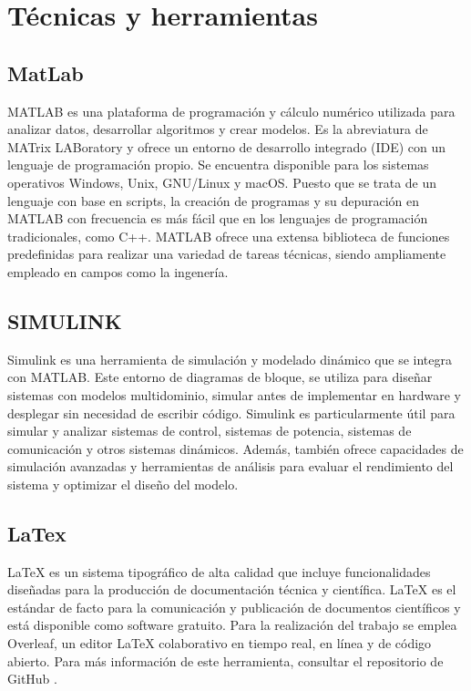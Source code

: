 \section{Técnicas y herramientas}

\subsection{MatLab}
MATLAB \cite{matlab2021matlab} es una plataforma de programación y cálculo numérico utilizada para analizar datos, desarrollar algoritmos y crear modelos. Es la abreviatura de MATrix LABoratory y ofrece un entorno de desarrollo integrado (IDE) con un lenguaje de programación propio. Se encuentra disponible para los sistemas operativos Windows, Unix, GNU/Linux y macOS. Puesto que se trata de un lenguaje con base en scripts, la creación de programas y su depuración en MATLAB con frecuencia es más fácil que en los lenguajes de programación tradicionales, como C++. MATLAB ofrece una extensa biblioteca de funciones predefinidas para realizar una variedad de tareas técnicas, siendo ampliamente empleado en campos como la ingenería.
\subsection{SIMULINK}

Simulink es una herramienta de simulación y modelado dinámico que se integra con MATLAB. Este entorno de diagramas de bloque, se utiliza para diseñar sistemas con modelos multidominio, simular antes de implementar en hardware y desplegar sin necesidad de escribir código. Simulink es particularmente útil para simular y analizar sistemas de control, sistemas de potencia, sistemas de comunicación y otros sistemas dinámicos. Además,  también ofrece capacidades de simulación avanzadas y herramientas de análisis para evaluar el rendimiento del sistema y optimizar el diseño del modelo.

\subsection{LaTex}
LaTeX \cite{latexweb} es un sistema tipográfico de alta calidad que incluye funcionalidades diseñadas para la producción de documentación técnica y científica. LaTeX es el estándar de facto para la comunicación y publicación de documentos científicos y está disponible como software gratuito. Para la realización del trabajo se emplea Overleaf, un editor LaTeX colaborativo en tiempo real, en línea y de código abierto. Para más información de este herramienta, consultar el repositorio de GitHub  \cite{overleafgithub}.
